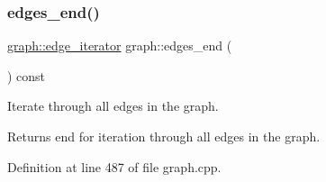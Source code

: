 \subsubsection{\texorpdfstring{edges\+\_\+end()}{edges\_end()}}
{\footnotesize\ttfamily \mbox{\hyperlink{classgraph_a818d3766018eb0af91d520ce2150203c}{graph\+::edge\+\_\+iterator}} graph\+::edges\+\_\+end (\begin{DoxyParamCaption}{ }\end{DoxyParamCaption}) const}

Iterate through all edges in the graph.

\begin{DoxyReturn}{Returns}
end for iteration through all edges in the graph. 
\end{DoxyReturn}


Definition at line 487 of file graph.\+cpp.


